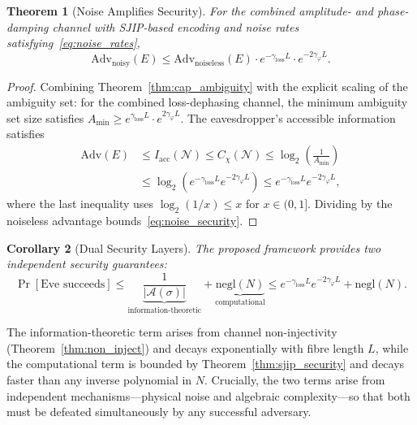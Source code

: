 \documentclass[journal,twocolumn]{IEEEtran}
\theoremstyle{definition}
\theoremstyle{plain}
\newtheorem{theorem}{Theorem}[section]
\newtheorem{corollary}[theorem]{Corollary}
\begin{document}
\begin{theorem}[Noise Amplifies Security]
\label{thm:noise_security}
For the combined amplitude- and phase-damping channel with
SJIP-based encoding and noise rates satisfying~\eqref{eq:noise_rates},
\begin{equation}
  \mathrm{Adv}_{\mathrm{noisy}}(E) \le
  \mathrm{Adv}_{\mathrm{noiseless}}(E)\cdot
  e^{-\gamma_{\mathrm{loss}}L}\cdot e^{-2\gamma_\varphi L}.
  \label{eq:noise_security}
\end{equation}
\end{theorem}

\begin{proof}
Combining Theorem~\ref{thm:cap_ambiguity} with the explicit scaling
of the ambiguity set: for the combined loss-dephasing channel, the
minimum ambiguity set size satisfies $A_{\min} \ge
e^{\gamma_{\mathrm{loss}}L} \cdot e^{2\gamma_\varphi L}$.
The eavesdropper's accessible information satisfies
\begin{align}
  \mathrm{Adv}(E) &\le I_{\mathrm{acc}}(\mathcal{N})
  \le C_\chi(\mathcal{N})
  \le \log_2\!\left(\frac{1}{A_{\min}}\right) \nonumber\\
  &\le \log_2\!\left(e^{-\gamma_{\mathrm{loss}}L}
    e^{-2\gamma_\varphi L}\right)
  \le e^{-\gamma_{\mathrm{loss}}L} e^{-2\gamma_\varphi L},
  \label{eq:noise_adv_proof}
\end{align}
where the last inequality uses $\log_2(1/x) \le x$ for
$x \in (0,1]$.  Dividing by the noiseless advantage
bounds~\eqref{eq:noise_security}.
\end{proof}

\begin{corollary}[Dual Security Layers]
\label{cor:dual_security}
The proposed framework provides two independent security
guarantees:
\begin{equation}
  \Pr[\text{Eve succeeds}] \le
  \underbrace{\frac{1}{|\mathcal{A}(\sigma)|}}_{\text{information-theoretic}}
  + \underbrace{\mathrm{negl}(N)}_{\text{computational}}
  \le e^{-\gamma_{\mathrm{loss}}L} e^{-2\gamma_\varphi L}
  + \mathrm{negl}(N).
  \label{eq:dual_security}
\end{equation}
\end{corollary}

The information-theoretic term arises from channel non-injectivity
(Theorem~\ref{thm:non_inject}) and decays exponentially with fibre
length $L$, while the computational term is bounded by
Theorem~\ref{thm:sjip_security} and decays faster than any inverse
polynomial in $N$.  Crucially, the two terms arise from independent
mechanisms---physical noise and algebraic complexity---so that both
must be defeated simultaneously by any successful adversary.
\end{document}
